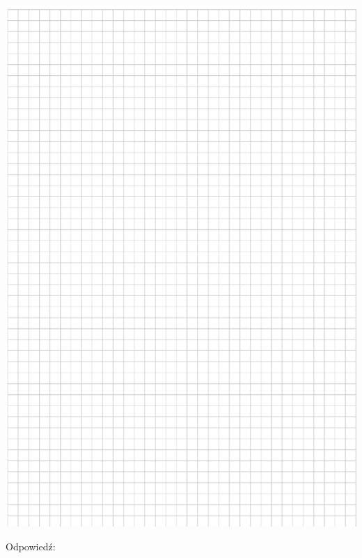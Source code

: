 \documentclass[10pt]{article}
\begin{document}
\includegraphics[max width=\textwidth, center]{2024_11_21_d9af6ed2d610d3f2d2cbg-17}

Odpowiedź:
\end{document}
